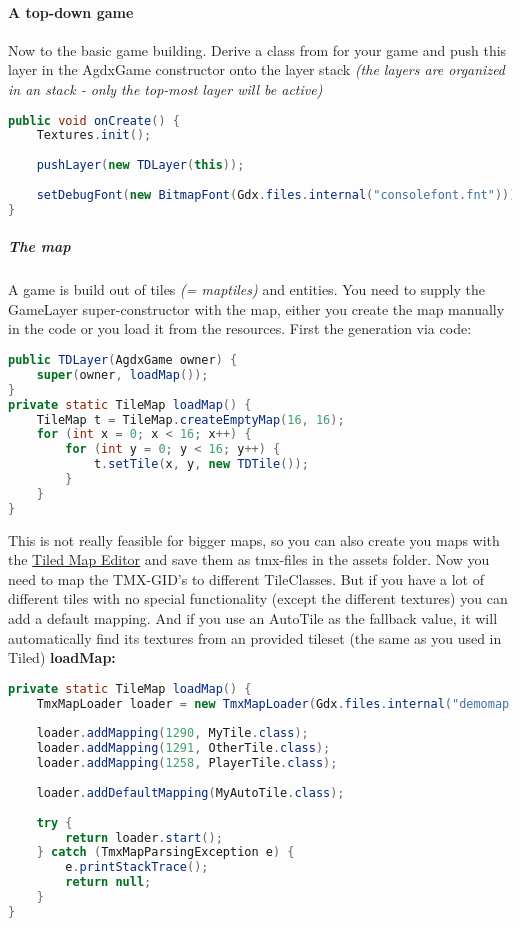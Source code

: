\paragraph{A top-down game}

Now to the basic game building. Derive a class from  for your game and push this layer in the AgdxGame constructor onto the layer stack \textit{(the layers are organized in an stack - only the top-most layer will be active)}

\doinline
\begin{lstlisting}[caption=Markdown Tutorial: fenced code block, title=\hspace{0 pt}, language=java]
public void onCreate() {
	Textures.init();
	
	pushLayer(new TDLayer(this));
	
	setDebugFont(new BitmapFont(Gdx.files.internal("consolefont.fnt")));
}
\end{lstlisting}

\subparagraph{The map}

A game is build out of tiles \textit{(= maptiles)} and entities. You need to supply the GameLayer super-constructor with the map, either you create the map manually in the code or you load it from the resources.
First the generation via code:

\doinline
\begin{lstlisting}[caption=Markdown Tutorial: fenced code block, title=\hspace{0 pt}, language=java]
public TDLayer(AgdxGame owner) {
	super(owner, loadMap());
}
private static TileMap loadMap() {
	TileMap t = TileMap.createEmptyMap(16, 16);
	for (int x = 0; x < 16; x++) {
		for (int y = 0; y < 16; y++) {
			t.setTile(x, y, new TDTile());
		}
	}
}
\end{lstlisting}

This is not really feasible for bigger maps, so you can also create you maps with the \hyperlink{http://www.mapeditor.org/}{Tiled Map Editor} and save them as tmx-files in the assets folder.
Now you need to map the TMX-GID's to different TileClasses. But if you have a lot of different tiles with no special functionality (except the different textures) you can add a default mapping. And if you use an AutoTile as the fallback value, it will automatically find its textures from an provided tileset (the same as you used in Tiled)
\textbf{loadMap:}

\doinline
\begin{lstlisting}[caption=Markdown Tutorial: fenced code block, title=\hspace{0 pt}, language=java]
private static TileMap loadMap() {
	TmxMapLoader loader = new TmxMapLoader(Gdx.files.internal("demomap.tmx"));
	
	loader.addMapping(1290, MyTile.class);
	loader.addMapping(1291, OtherTile.class);
	loader.addMapping(1258, PlayerTile.class);
	
	loader.addDefaultMapping(MyAutoTile.class);
	
	try {
		return loader.start();
	} catch (TmxMapParsingException e) {
		e.printStackTrace();
		return null;
	}
}
\end{lstlisting}

